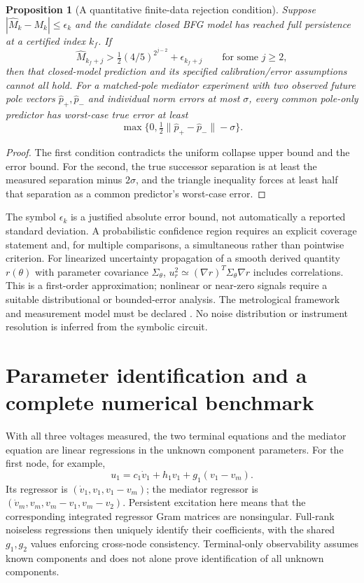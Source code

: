 \documentclass[11pt,letterpaper]{article}
\newtheorem{proposition}[theorem]{Proposition}
\theoremstyle{definition}
\numberwithin{equation}{section}
\begin{document}
\begin{proposition}[A quantitative finite-data rejection condition]\label{rcfiniteerror}
Suppose $|\widehat M_k-M_k|\leq\epsilon_k$ and the candidate closed BFG model has reached full persistence at a certified index $k_f$. If
\begin{equation}\label{rcfinitecriterion}
\widehat M_{k_f+j}>\tfrac12(4/5)^{2^{j-2}}+\epsilon_{k_f+j}
\qquad\text{for some }j\geq2,
\end{equation}
then that closed-model prediction and its specified calibration/error assumptions cannot all hold. For a matched-pole mediator experiment with two observed future pole vectors $\widehat p_+,\widehat p_-$ and individual norm errors at most $\sigma$, every common pole-only predictor has worst-case true error at least
\begin{equation}\label{rcfiberobserved}
\max\{0,\tfrac12\|\widehat p_+-\widehat p_-\|-\sigma\}.
\end{equation}
\end{proposition}
\begin{proof}
The first condition contradicts the uniform collapse upper bound and the error bound. For the second, the true successor separation is at least the measured separation minus $2\sigma$, and the triangle inequality forces at least half that separation as a common predictor's worst-case error.
\end{proof}
The symbol $\epsilon_k$ is a justified absolute error bound, not automatically a reported standard deviation. A probabilistic confidence region requires an explicit coverage statement and, for multiple comparisons, a simultaneous rather than pointwise criterion. For linearized uncertainty propagation of a smooth derived quantity $r(\theta)$ with parameter covariance $\Sigma_\theta$, $u_r^2\simeq (\nabla r)^T\Sigma_\theta\nabla r$ includes correlations. This is a first-order approximation; nonlinear or near-zero signals require a suitable distributional or bounded-error analysis. The metrological framework and measurement model must be declared \cite{gum}. No noise distribution or instrument resolution is inferred from the symbolic circuit.

\section{Parameter identification and a complete numerical benchmark}
With all three voltages measured, the two terminal equations and the mediator equation are linear regressions in the unknown component parameters. For the first node, for example,
\begin{equation}\label{rcregression}
u_1=c_1\dot v_1+h_1v_1+g_1(v_1-v_m).
\end{equation}
Its regressor is $(\dot v_1,v_1,v_1-v_m)$; the mediator regressor is $(\dot v_m,v_m,v_m-v_1,v_m-v_2)$. Persistent excitation here means that the corresponding integrated regressor Gram matrices are nonsingular. Full-rank noiseless regressions then uniquely identify their coefficients, with the shared $g_1,g_2$ values enforcing cross-node consistency. Terminal-only observability assumes known components and does not alone prove identification of all unknown components.
\end{document}
